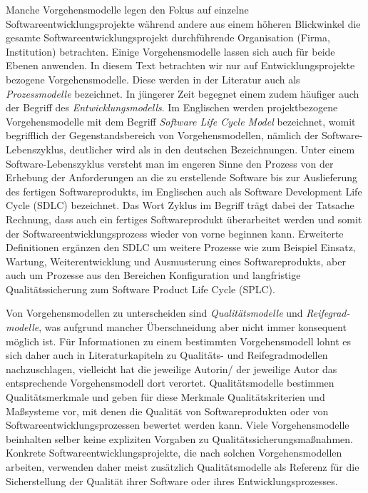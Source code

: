 Manche Vorgehensmodelle legen den Fokus auf einzelne Softwareentwicklungsprojekte während andere aus einem höheren Blickwinkel die gesamte Softwareentwicklungsprojekt durchführende Organisation (Firma, Institution) betrachten. Einige Vorgehensmodelle lassen sich auch für beide Ebenen anwenden. In diesem Text betrachten wir nur auf Entwicklungsprojekte bezogene Vorgehensmodelle. Diese werden in der Literatur auch als \textit{Prozessmodelle} bezeichnet. In jüngerer Zeit begegnet einem zudem häufiger auch der Begriff des \textit{Entwicklungsmodells}. Im Englischen werden projektbezogene Vorgehensmodelle mit dem Begriff \textit{Software Life Cycle Model} bezeichnet, 
womit begrifflich der Gegenstandsbereich von Vorgehensmodellen, nämlich der Software-Lebenszyklus, deutlicher wird als in den deutschen Bezeichnungen. Unter einem Software-Lebenszyklus versteht man im engeren Sinne den Prozess von der Erhebung der Anforderungen an die zu erstellende Software bis zur Auslieferung des fertigen Softwareprodukts, im Englischen auch als Software Development Life Cycle (SDLC) bezeichnet. Das Wort Zyklus im Begriff trägt dabei der Tatsache Rechnung, dass auch ein fertiges Softwareprodukt überarbeitet werden und somit der Softwareentwicklungsprozess wieder von vorne beginnen kann. Erweiterte Definitionen ergänzen den SDLC um weitere Prozesse wie zum Beispiel Einsatz, Wartung, Weiterentwicklung und Ausmusterung eines Softwareprodukts, aber auch um Prozesse aus den Bereichen Konfiguration und langfristige Qualitätssicherung zum Software Product Life Cycle (SPLC).

Von Vorgehensmodellen zu unterscheiden sind \textit{Qualitätsmodelle} und \textit{Reifegrad-
	\linebreak %
	modelle}, was aufgrund mancher Überschneidung aber nicht immer konsequent möglich ist. Für Informationen zu einem bestimmten Vorgehensmodell lohnt es sich daher auch in Literaturkapiteln zu Qualitäts- und Reifegradmodellen nachzuschlagen, vielleicht hat die jeweilige Autorin/ der jeweilige Autor das entsprechende Vorgehensmodell dort verortet. Qualitätsmodelle 
bestimmen Qualitätsmerkmale und geben für diese Merkmale Qualitätskriterien und Maßsysteme vor, mit denen die Qualität von Softwareprodukten oder von Softwareentwicklungsprozessen bewertet werden kann. Viele Vorgehensmodelle beinhalten selber keine expliziten Vorgaben zu Qualitätssicherungsmaßnahmen. Konkrete Softwareentwicklungsprojekte, die nach solchen Vorgehensmodellen arbeiten, verwenden daher meist zusätzlich Qualitätsmodelle als Referenz für die Sicherstellung der Qualität ihrer Software oder ihres Entwicklungsprozesses.


